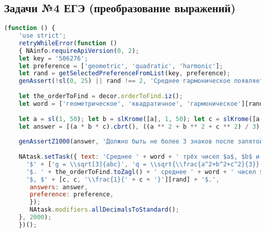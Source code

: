 \subsection{Задачи №4 ЕГЭ (преобразование выражений)}

\begin{lstlisting}[language=JavaScript]
(function () { 
    'use strict'; 
    retryWhileError(function () 
    { NAinfo.requireApiVersion(0, 2); 
    let key = '506276'; 
    let preference = ['geometric', 'quadratic', 'harmonic']; 
    let rand = getSelectedPreferenceFromList(key, preference);
    genAssert(!sl(0, 25) || rand !== 2, 'Среднее гармоническое появляется слишком часто'); 
     
    let the_orderToFind = decor.orderToFind.iz(); 
    let word = ['геометрическое', 'квадратичное', 'гармоническое'][rand]; 
     
    let a = sl(1, 50); let b = slKrome([a], 1, 50); let c = slKrome([a, b], 1, 50); 
    let answer = [(a * b * c).cbrt(), ((a ** 2 + b ** 2 + c ** 2) / 3).sqrt(), 3 / (a + b + c)][rand];
     
    genAssertZ1000(answer, 'Должно быть не более 3 знаков после запятой'); 
     
    NAtask.setTask({ text: 'Среднее ' + word + ' трёх чисел $a$, $b$ и $c$ вычисляется по формуле ' +
      '$' + ['g = \\sqrt[3]{abc}', 'q = \\sqrt{\\frac{a^2+b^2+c^2}{3}}', 'h = \\left(\\frac{\\frac{1}{a}+\\frac{1}{b}+\\frac{1}{c}}{3} \\right)^{-1}'][rand] + '$.' +
      '$. ' + the_orderToFind.toZagl() + ' среднее ' + word + ' чисел $' + [a, a, '\\frac{1}{' + a + '}'][rand] + '$, $' + [b, b, '\\frac{1}{' + b + '}'][rand] + 
      '$, $' + [c, c, '\\frac{1}{' + c + '}'][rand] + '$.',
       answers: answer, 
       preference: preference, 
       }); 
       NAtask.modifiers.allDecimalsToStandard();
    }, 2000); 
    })();
\end{lstlisting}